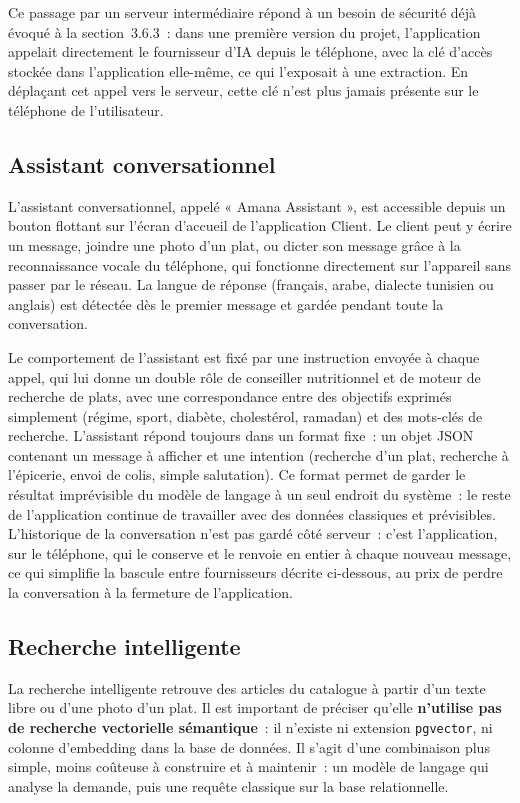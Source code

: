 \documentclass[12pt,fleqn,a4paper]{report}
\begin{document}
\begin{justify}
Ce passage par un serveur intermédiaire répond à un besoin de sécurité déjà évoqué à la section~3.6.3~: dans une première version du projet, l'application appelait directement le fournisseur d'IA depuis le téléphone, avec la clé d'accès stockée dans l'application elle-même, ce qui l'exposait à une extraction. En déplaçant cet appel vers le serveur, cette clé n'est plus jamais présente sur le téléphone de l'utilisateur.

\subsection{Assistant conversationnel}

L'assistant conversationnel, appelé « Amana Assistant », est accessible depuis un bouton flottant sur l'écran d'accueil de l'application Client. Le client peut y écrire un message, joindre une photo d'un plat, ou dicter son message grâce à la reconnaissance vocale du téléphone, qui fonctionne directement sur l'appareil sans passer par le réseau. La langue de réponse (français, arabe, dialecte tunisien ou anglais) est détectée dès le premier message et gardée pendant toute la conversation.

Le comportement de l'assistant est fixé par une instruction envoyée à chaque appel, qui lui donne un double rôle de conseiller nutritionnel et de moteur de recherche de plats, avec une correspondance entre des objectifs exprimés simplement (régime, sport, diabète, cholestérol, ramadan) et des mots-clés de recherche. L'assistant répond toujours dans un format fixe~: un objet JSON contenant un message à afficher et une intention (recherche d'un plat, recherche à l'épicerie, envoi de colis, simple salutation). Ce format permet de garder le résultat imprévisible du modèle de langage à un seul endroit du système~: le reste de l'application continue de travailler avec des données classiques et prévisibles. L'historique de la conversation n'est pas gardé côté serveur~: c'est l'application, sur le téléphone, qui le conserve et le renvoie en entier à chaque nouveau message, ce qui simplifie la bascule entre fournisseurs décrite ci-dessous, au prix de perdre la conversation à la fermeture de l'application.

\subsection{Recherche intelligente}

La recherche intelligente retrouve des articles du catalogue à partir d'un texte libre ou d'une photo d'un plat. Il est important de préciser qu'elle \textbf{n'utilise pas de recherche vectorielle sémantique}~: il n'existe ni extension \texttt{pgvector}, ni colonne d'embedding dans la base de données. Il s'agit d'une combinaison plus simple, moins coûteuse à construire et à maintenir~: un modèle de langage qui analyse la demande, puis une requête classique sur la base relationnelle.


\end{justify}
\end{document}
